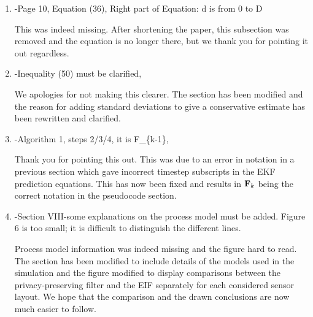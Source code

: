 \documentclass[a4paper]{scrartcl}
\newenvironment{rebuttal}{\begin{enumerate}[label={\color{grey}\thesection.\arabic{enumi}},leftmargin=0pt,ref=\thesection.\arabic{enumi}]}{\end{enumerate}}
\newcommand{\reviewtext}[1]{{\color{nblue} #1}}
\begin{document}
\begin{rebuttal}
Due to the number of components in the proposed method (encoding, encryption and estimation), we aimed to present the algorithm pseudocode as the summary of the method, and regret that this was not made clearer. We have rewritten and reorganised the localisation section and have tried to make a pseudocode summary, and its purpose, clearer. We hope that the updated manuscript now presents a better overall summary after all the components are presented.

\item \reviewtext{-Page 10, Equation (36), Right part of Equation: d is from 0 to D}

This was indeed missing. After shortening the paper, this subsection was removed and the equation is no longer there, but we thank you for pointing it out regardless. 

\item \reviewtext{-Inequality (50) must be clarified,}

We apologies for not making this clearer. The section has been modified and the reason for adding standard deviations to give a conservative estimate has been rewritten and clarified.

\item \reviewtext{-Algorithm 1, steps 2/3/4, it is F\_\{k-1\},}

Thank you for pointing this out. This was due to an error in notation in a previous section which gave incorrect timestep subscripts in the EKF prediction equations. This has now been fixed and results in ${{\mathbf{F}}}_k$ being the correct notation in the pseudocode section.

\item \reviewtext{-Section VIII-some explanations on the process model must be added. Figure 6 is too small; it is difficult to distinguish the different lines.}

Process model information was indeed missing and the figure hard to read. The section has been modified to include details of the models used in the simulation and the figure modified to display comparisons between the privacy-preserving filter and the EIF separately for each considered sensor layout. We hope that the comparison and the drawn conclusions are now much easier to follow.

\end{rebuttal}

\end{document}
